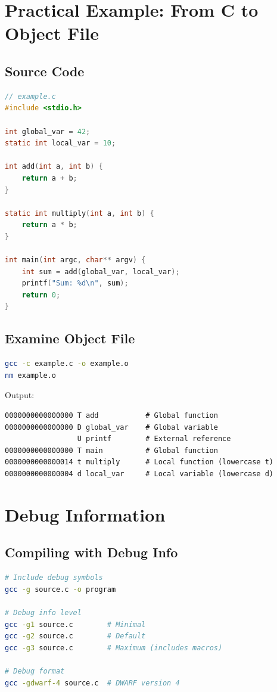 \section{Practical Example: From C to Object File}

\subsection{Source Code}

\begin{lstlisting}[language=C]
// example.c
#include <stdio.h>

int global_var = 42;
static int local_var = 10;

int add(int a, int b) {
    return a + b;
}

static int multiply(int a, int b) {
    return a * b;
}

int main(int argc, char** argv) {
    int sum = add(global_var, local_var);
    printf("Sum: %d\n", sum);
    return 0;
}
\end{lstlisting}

\subsection{Examine Object File}

\begin{lstlisting}[language=bash]
gcc -c example.c -o example.o
nm example.o
\end{lstlisting}

Output:
\begin{verbatim}
0000000000000000 T add           # Global function
0000000000000000 D global_var    # Global variable
                 U printf        # External reference
0000000000000000 T main          # Global function
0000000000000014 t multiply      # Local function (lowercase t)
0000000000000004 d local_var     # Local variable (lowercase d)
\end{verbatim}

\section{Debug Information}

\subsection{Compiling with Debug Info}

\begin{lstlisting}[language=bash]
# Include debug symbols
gcc -g source.c -o program

# Debug info level
gcc -g1 source.c        # Minimal
gcc -g2 source.c        # Default
gcc -g3 source.c        # Maximum (includes macros)

# Debug format
gcc -gdwarf-4 source.c  # DWARF version 4
\end{lstlisting}

